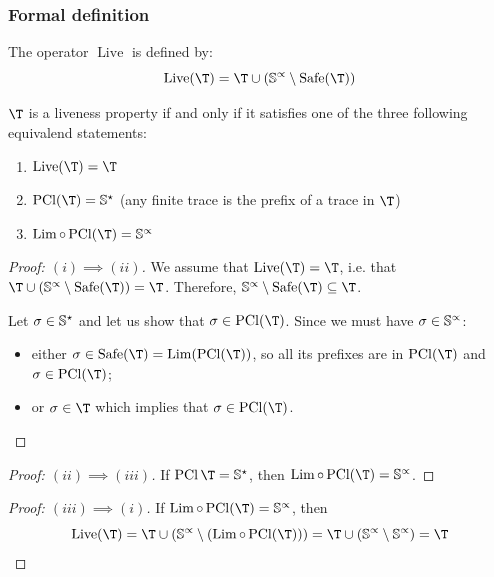 \documentclass[toc, titlepaged]{../cs-classes/cs-classes}
\DeclareMathOperator{\pcl}{PCl}
\DeclareMathOperator{\Lim}{Lim}
\DeclareMathOperator{\safe}{Safe}
\DeclareMathOperator{\live}{Live}
\begin{document}
\subsubsection{Formal definition}
\begin{definition}[Operator $\live$]
    The operator $\live$ is defined by:
    \begin{equation*}
        \live(\T) = \T \cup (\S^\propto \setminus \safe(\T))
    \end{equation*}
\end{definition}

\begin{definition}
    $\T$ is a liveness property if and only if it satisfies one of the three following equivalend statements:   
    \begin{enumerate}[label=(\roman*)]
        \item $\live(\T) = \T$
        \item $\pcl(\T) = \S^\star$ (any finite trace is the prefix of a trace in $\T$)
        \item $\Lim \circ \pcl(\T) = \S^\propto$
    \end{enumerate}
\end{definition}
\begin{proof}[Proof: $(i) \implies (ii)$]
    We assume that $\live(\T) = \T$, i.e. that $\T\cup(\S^\propto\setminus\safe(\T)) = \T$. Therefore, $\S^\propto\setminus\safe(\T) \subseteq \T$.

    Let $\sigma\in\S^\star$ and let us show that $\sigma\in\pcl(\T)$. Since we must have $\sigma\in\S^\propto$:
    \begin{itemize}
        \item either $\sigma\in\safe(\T) = \Lim(\pcl(\T))$, so all its prefixes are in $\pcl(\T)$ and $\sigma\in\pcl(\T)$;
        \item or $\sigma\in\T$ which implies that $\sigma\in\pcl(\T)$.
    \end{itemize}
\end{proof}
\begin{proof}[Proof: $(ii) \implies (iii)$]
    If $\pcl{\T}=\S^\star$, then $\Lim\circ\pcl(\T) = \S^\propto$.
\end{proof}
\begin{proof}[Proof: $(iii) \implies (i)$]
    If $\Lim\circ\pcl(\T) = \S^\propto$, then
    \begin{equation*}
        \live(\T) = \T\cup(\S^\propto\setminus(\Lim\circ\pcl(\T))) = \T \cup (\S^\propto\setminus\S^\propto) = \T
    \end{equation*}
\end{proof}
\end{document}
